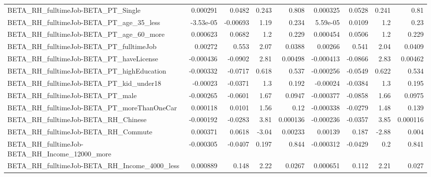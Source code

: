 \begin{tabular}{lrrrrrrrr}
BETA\_RH\_fulltimeJob-BETA\_PT\_Single                 &    0.000291 &       0.0482 &    0.243 &    0.808 &   0.000325 &      0.0528 &        0.241 &          0.81 \\
BETA\_RH\_fulltimeJob-BETA\_PT\_age\_35\_less            &   -3.53e-05 &     -0.00693 &     1.19 &    0.234 &   5.59e-05 &      0.0109 &          1.2 &          0.23 \\
BETA\_RH\_fulltimeJob-BETA\_PT\_age\_60\_more            &    0.000623 &       0.0682 &      1.2 &    0.229 &   0.000454 &      0.0506 &          1.2 &         0.229 \\
BETA\_RH\_fulltimeJob-BETA\_PT\_fulltimeJob            &     0.00272 &        0.553 &     2.07 &   0.0388 &    0.00266 &       0.541 &         2.04 &        0.0409 \\
BETA\_RH\_fulltimeJob-BETA\_PT\_haveLicense            &   -0.000436 &      -0.0902 &     2.81 &  0.00498 &  -0.000413 &     -0.0866 &         2.83 &       0.00462 \\
BETA\_RH\_fulltimeJob-BETA\_PT\_highEducation          &   -0.000332 &      -0.0717 &    0.618 &    0.537 &  -0.000256 &     -0.0549 &        0.622 &         0.534 \\
BETA\_RH\_fulltimeJob-BETA\_PT\_kid\_under18            &    -0.00023 &      -0.0371 &      1.3 &    0.192 &   -0.00024 &     -0.0384 &          1.3 &         0.195 \\
BETA\_RH\_fulltimeJob-BETA\_PT\_male                   &   -0.000265 &      -0.0601 &     1.67 &   0.0947 &  -0.000377 &     -0.0858 &         1.66 &        0.0975 \\
BETA\_RH\_fulltimeJob-BETA\_PT\_moreThanOneCar         &    0.000118 &       0.0101 &     1.56 &     0.12 &  -0.000338 &     -0.0279 &         1.48 &         0.139 \\
BETA\_RH\_fulltimeJob-BETA\_RH\_Chinese                &   -0.000192 &      -0.0283 &     3.81 & 0.000136 &  -0.000236 &     -0.0357 &         3.85 &      0.000116 \\
BETA\_RH\_fulltimeJob-BETA\_RH\_Commute                &    0.000371 &       0.0618 &    -3.04 &  0.00233 &    0.00139 &       0.187 &        -2.88 &         0.004 \\
BETA\_RH\_fulltimeJob-BETA\_RH\_Income\_12000\_more      &   -0.000305 &      -0.0407 &    0.197 &    0.844 &  -0.000312 &     -0.0429 &          0.2 &         0.841 \\
BETA\_RH\_fulltimeJob-BETA\_RH\_Income\_4000\_less       &    0.000889 &        0.148 &     2.22 &   0.0267 &   0.000651 &       0.112 &         2.21 &         0.027 \\

\end{tabular}

